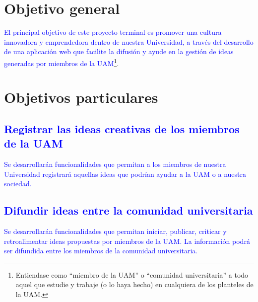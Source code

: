 \documentclass[11pt,letterpaper,titlepage]{article}
\begin{document}
\section{Objetivo general}
\textcolor{blue}{El principal objetivo de este proyecto terminal es promover una cultura innovadora y emprendedora dentro de nuestra Universidad, a trav\'es del desarrollo de una aplicaci\'on web que facilite la difusi\'on y ayude en la gesti\'on de ideas generadas por miembros de la UAM}\footnote{Entiendase como ``miembro de la UAM'' o ``comunidad universitaria'' a todo aquel que estudie y trabaje (o lo haya hecho) en cualquiera de los planteles de la UAM.}.




\section{Objetivos particulares}
\textcolor{blue}{
\subsection{Registrar las ideas creativas de los miembros de la UAM}
Se desarrollar\'an funcionalidades que permitan a los miembros de nuestra Universidad registrar\'a aquellas ideas que podr\'ian ayudar a la UAM o a nuestra sociedad. }


\textcolor{blue}{
\subsection{Difundir ideas entre la comunidad universitaria}
Se desarrollar\'an funcionalidades que permitan iniciar, publicar, criticar y retroalimentar ideas propuestas por miembros de la UAM. La informaci\'on podr\'a ser difundida entre los miembros de la comunidad universitaria.}
\end{document}
